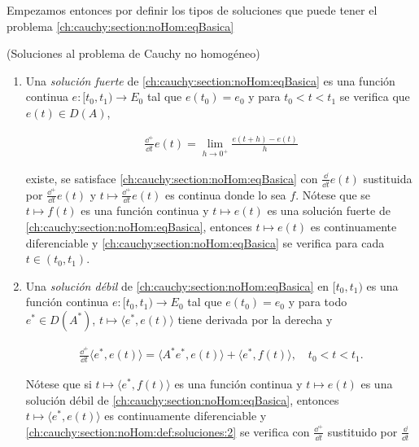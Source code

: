 Empezamos entonces por definir los tipos de soluciones que puede tener el problema \eqref{ch:cauchy:section:noHom:eqBasica}\\

\begin{Definicion}{(Soluciones al problema de Cauchy no homogéneo)}
    \label{ch:cauchy:section:noHom:def:soluciones}

    \begin{enumerate}[label=\alph*)]
        \item Una \textit{solución fuerte} de \eqref{ch:cauchy:section:noHom:eqBasica} es una función continua $e : [t_0, t_1) \rightarrow E_0$ tal que $e(t_0) = e_0$ y para $t_0 < t < t_1$ se verifica que $e(t) \in D(A)$, 

        \begin{align}
        \label{ch:cauchy:section:noHom:def:soluciones:1}
        \frac{\dd^+}{\dd t}e(t) = \lim_{h \rightarrow 0^+} \frac{e(t+h) - e(t)}{h}
        \end{align}

        existe, se satisface \eqref{ch:cauchy:section:noHom:eqBasica} con $\displaystyle\frac{\dd}{\dd t}e(t)$ sustituida por $\displaystyle\frac{\dd^+}{\dd t}e(t)$ y $t \mapsto \frac{\dd^+}{\dd t}e(t)$ es continua donde lo sea $f$. Nótese que se $t \mapsto f(t)$ es una función continua y $t \mapsto e(t)$ es una solución fuerte de \eqref{ch:cauchy:section:noHom:eqBasica}, entonces $t \mapsto e(t)$ es continuamente diferenciable y \eqref{ch:cauchy:section:noHom:eqBasica} se verifica para cada $t \in (t_0, t_1)$.

        \item Una \textit{solución débil} de \eqref{ch:cauchy:section:noHom:eqBasica} en $[t_0, t_1)$ es una función continua $e : [t_0, t_1) \rightarrow E_0$ tal que $e(t_0) = e_0$ y para todo $e^* \in D(A^*)$, $t\mapsto \langle e^*, e(t) \rangle$ tiene derivada por la derecha y

        \begin{align}
        \label{ch:cauchy:section:noHom:def:soluciones:2}
        \frac{\dd^+}{\dd t}\langle e^*, e(t)\rangle = \langle A^* e^*, e(t) \rangle + \langle e^*, f(t) \rangle, \quad t_0 < t < t_1.
        \end{align}

        Nótese que si $t \mapsto \langle e^*, f(t) \rangle$ es una función continua y $t \mapsto e(t)$ es una solución débil de \eqref{ch:cauchy:section:noHom:eqBasica}, entonces $t \mapsto \langle e^*, e(t) \rangle$ es continuamente diferenciable y \eqref{ch:cauchy:section:noHom:def:soluciones:2} se verifica con $\displaystyle\frac{\dd^+}{\dd t}$ sustituido por $\displaystyle\frac{\dd}{\dd t}$
    \end{enumerate}
\end{Definicion}

